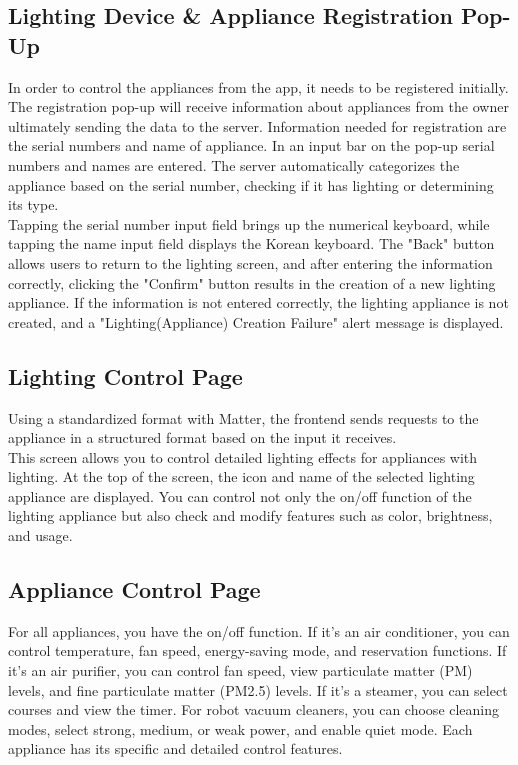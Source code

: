 \documentclass[conference]{IEEEtran}
\begin{document}
    \subsection{Lighting Device \& Appliance Registration Pop-Up}
        In order to control the appliances from the app, it needs to be registered initially. The registration pop-up will receive information about appliances from the owner ultimately sending the data to the server. Information needed for registration are the serial numbers and name of appliance. In an input bar on the pop-up serial numbers and names are entered. The server automatically categorizes the appliance based on the serial number, checking if it has lighting or determining its type.\\
        Tapping the serial number input field brings up the numerical keyboard, while tapping the name input field displays the Korean keyboard. The "Back" button allows users to return to the lighting screen, and after entering the information correctly, clicking the "Confirm" button results in the creation of a new lighting appliance. If the information is not entered correctly, the lighting appliance is not created, and a "Lighting(Appliance) Creation Failure" alert message is displayed.

    \subsection{Lighting Control Page}
        Using a standardized format with Matter, the frontend sends requests to the appliance in a structured format based on the input it receives.\\
        This screen allows you to control detailed lighting effects for appliances with lighting. At the top of the screen, the icon and name of the selected lighting appliance are displayed. You can control not only the on/off function of the lighting appliance but also check and modify features such as color, brightness, and usage.

    \subsection{Appliance Control Page}
        For all appliances, you have the on/off function. If it's an air conditioner, you can control temperature, fan speed, energy-saving mode, and reservation functions. If it's an air purifier, you can control fan speed, view particulate matter (PM) levels, and fine particulate matter (PM2.5) levels. If it's a steamer, you can select courses and view the timer. For robot vacuum cleaners, you can choose cleaning modes, select strong, medium, or weak power, and enable quiet mode. Each appliance has its specific and detailed control features.
\end{document}
